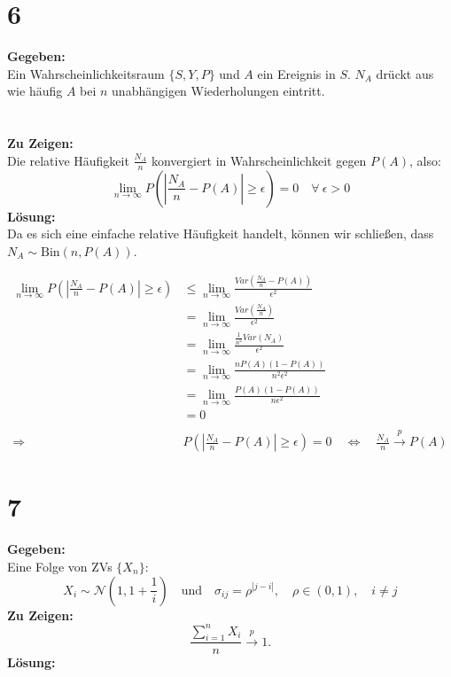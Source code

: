 \documentclass{article}
\begin{document}
\section*{6}
\textbf{Gegeben:}\\

Ein Wahrscheinlichkeitsraum $\{S, Y, P\}$ und $A$ ein Ereignis in $S$. $N_A$ drückt aus wie häufig $A$ bei $n$ unabhängigen Wiederholungen eintritt.\\\\\\  
\textbf{Zu Zeigen:}\\

Die relative Häufigkeit $\frac{N_A}{n}$ konvergiert in Wahrscheinlichkeit gegen $P(A)$, also:
\[\lim_{n \rightarrow \infty} P(|\frac{N_A}{n}- P(A)| \geq \epsilon) = 0 \quad \forall~ \epsilon > 0\]
\textbf{Lösung:}\\

Da es sich eine einfache relative Häufigkeit handelt, können wir schließen, dass $N_A\sim \text{Bin}(n, P(A))$. 

\begin{align*}
    \lim_{n \rightarrow \infty}P(|\frac{N_A}{n} - P(A) |\geq \epsilon) &\leq \lim_{n \rightarrow \infty}\frac{Var(\frac{N_A}{n} - P(A))}{\epsilon^2} \\
    &=\lim_{n \rightarrow \infty} \frac{Var(\frac{N_A}{n})}{\epsilon^2} \\
    &=\lim_{n \rightarrow \infty} \frac{\frac{1}{n^2}Var(N_A)}{\epsilon^2} \\
    &= \lim_{n \rightarrow \infty} \frac{nP(A)(1-P(A))}{n^2\epsilon^2} \\
    &= \lim_{n \rightarrow \infty} \frac{P(A)(1-P(A))}{n\epsilon^2} \\
    &= 0 \\ \\
    \Longrightarrow \quad & P(|\frac{N_A}{n} - P(A) |\geq \epsilon) = 0 \quad \Leftrightarrow \quad \frac{N_A}{n} \overset{p}{\longrightarrow} P(A) 
\end{align*}

\section*{7}
\textbf{Gegeben:}\\

Eine Folge von ZVs $\{X_n\}$:
\[X_i \sim \mathcal{N}(1, 1 + \frac{1}{i}) \quad \text{und} \quad \sigma_{ij} = \rho^{|j-i|}, \quad \rho \in (0,1), \quad i \neq j\]
\textbf{Zu Zeigen:}\\
\[\frac{\sum_{i = 1}^{n}X_i}{n} \overset{p}{\longrightarrow} 1.\]
\textbf{Lösung:}\\
\end{document}
